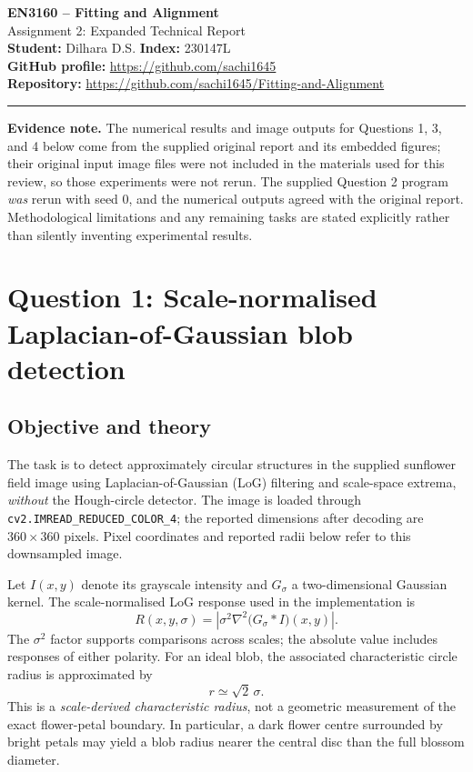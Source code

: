 \documentclass[11pt,a4paper]{article}
\begin{document}
\begin{center}
{\LARGE\bfseries\color{navy}EN3160 -- Fitting and Alignment}\\[5pt]
{\Large Assignment 2: Expanded Technical Report}\\[7pt]
\textbf{Student:} Dilhara D.S. \quad \textbf{Index:} 230147L\\
\textbf{GitHub profile:} \url{https://github.com/sachi1645}\\
\textbf{Repository:} \url{https://github.com/sachi1645/Fitting-and-Alignment}
\end{center}
\hrule\vspace{9pt}

\textbf{Evidence note.} The numerical results and image outputs for Questions 1, 3, and 4 below come from the supplied original report and its embedded figures; their original input image files were not included in the materials used for this review, so those experiments were not rerun. The supplied Question 2 program \emph{was} rerun with seed 0, and the numerical outputs agreed with the original report. Methodological limitations and any remaining tasks are stated explicitly rather than silently inventing experimental results.

\section{Question 1: Scale-normalised Laplacian-of-Gaussian blob detection}
\subsection{Objective and theory}
The task is to detect approximately circular structures in the supplied sunflower field image using Laplacian-of-Gaussian (LoG) filtering and scale-space extrema, \emph{without} the Hough-circle detector. The image is loaded through \texttt{cv2.IMREAD\_REDUCED\_COLOR\_4}; the reported dimensions after decoding are $360\times360$ pixels. Pixel coordinates and reported radii below refer to this downsampled image.

Let $I(x,y)$ denote its grayscale intensity and $G_\sigma$ a two-dimensional Gaussian kernel. The scale-normalised LoG response used in the implementation is
\begin{equation}
R(x,y,\sigma)=\left|\sigma^{2}\nabla^{2}\bigl(G_{\sigma}*I\bigr)(x,y)\right|.
\label{eq:log}
\end{equation}
The $\sigma^{2}$ factor supports comparisons across scales; the absolute value includes responses of either polarity. For an ideal blob, the associated characteristic circle radius is approximated by
\begin{equation}
  r\simeq\sqrt{2}\,\sigma.
\label{eq:blob_radius}
\end{equation}
This is a \emph{scale-derived characteristic radius}, not a geometric measurement of the exact flower-petal boundary. In particular, a dark flower centre surrounded by bright petals may yield a blob radius nearer the central disc than the full blossom diameter.
\end{document}
